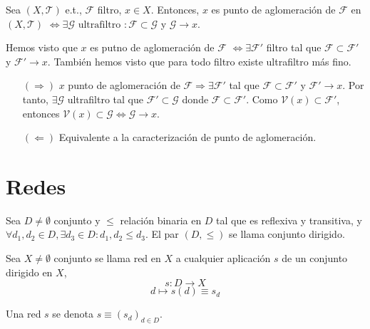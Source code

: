 \begin{prop}
  Sea $( X, \mathcal{T} )$ e.t., $\mathcal{F}$ filtro, $x \in X$. Entonces, $x$ es punto de aglomeración de $\mathcal{F}$ en $( X, \mathcal{T} )$ $\Leftrightarrow \exists \mathcal{G} \text{ ultrafiltro } : \mathcal{F} \subset \mathcal{G}$ y $\mathcal{G} \rightarrow x$.
\end{prop}

\begin{dem}
  Hemos visto que $x$ es putno de aglomeración de $\mathcal{F}$ $\Leftrightarrow \exists \mathcal{F}'$ filtro tal que $\mathcal{F} \subset \mathcal{F}'$ y $\mathcal{F}' \rightarrow x$. También hemos visto que para todo filtro existe ultrafiltro más fino.
 
  \begin{enumerate}[label=(\roman*)]
    \item [$(\Rightarrow)$] $x$ punto de aglomeración de $\mathcal{F} \Rightarrow \exists \mathcal{F}'$ tal que $\mathcal{F} \subset \mathcal{F}'$ y $\mathcal{F}' \rightarrow x$. Por tanto, $\exists \mathcal{G}$ ultrafiltro tal que $\mathcal{F}' \subset \mathcal{G}$ donde $\mathcal{F} \subset \mathcal{F}'$. Como $\mathcal{V}(x) \subset \mathcal{F}'$, entonces $\mathcal{V}(x) \subset \mathcal{G} \Leftrightarrow \mathcal{G} \rightarrow x$.

    \item [$(\Leftarrow)$] Equivalente a la caracterización de punto de aglomeración.
  \end{enumerate}
\end{dem}

\section{Redes}

\begin{defn}
  Sea $D \neq \emptyset$ conjunto y $\leq$ relación binaria en $D$ tal que es reflexiva y transitiva, y $\forall d_{1}, d_{2} \in D, \exists d_{3} \in D : d_{1}, d_{2} \leq d_{3}$. El par $(D, \leq)$ se llama conjunto dirigido.
\end{defn}

\begin{defn}[Red]
  Sea $X \neq \emptyset$ conjunto se llama red en $X$ a cualquier aplicación $s$ de un conjunto dirigido en $X$, 
  \[ 
    s : D \to X 
  \] 
  \[ 
    d \mapsto s(d) \equiv s_{d} 
  \] 
\end{defn}

\begin{nota}
  Una red $s$ se denota $s \equiv (s_{d})_{d \in D}$.
\end{nota}

